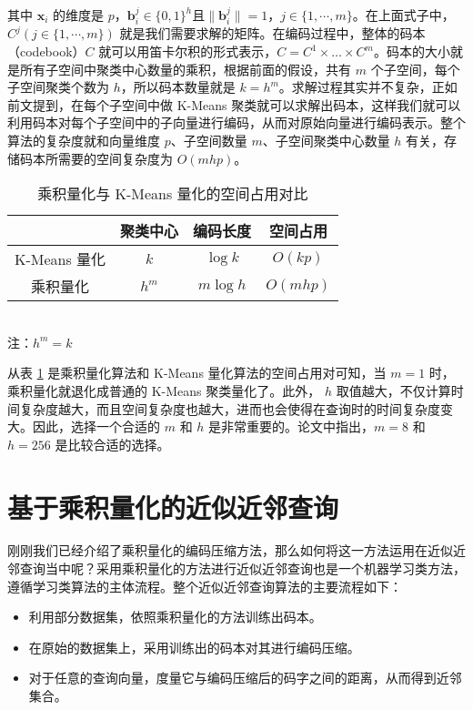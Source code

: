 其中 $\mathbf{x}_i$ 的维度是 $p$，$\mathbf{b}^j_i \in \{0,1\}^h$且$\lVert\mathbf{b}^j_i\rVert=1$，$j \in \{1,\cdots,m\}$。在上面式子中，$C^j(j\in \{1,\cdots,m\})$ 就是我们需要求解的矩阵。在编码过程中，整体的码本（codebook）$C$ 就可以用笛卡尔积的形式表示，$C = C^1 \times \ldots \times C^m$。码本的大小就是所有子空间中聚类中心数量的乘积，根据前面的假设，共有 $m$ 个子空间，每个子空间聚类个数为 $h$，所以码本数量就是 $k = h^m$。求解过程其实并不复杂，正如前文提到，在每个子空间中做 K-Means 聚类就可以求解出码本，这样我们就可以利用码本对每个子空间中的子向量进行编码，从而对原始向量进行编码表示。整个算法的复杂度就和向量维度 $p$、子空间数量 $m$、子空间聚类中心数量 $h$ 有关，存储码本所需要的空间复杂度为 $O(mhp)$。
\begin{table}[htbp]
  \centering
  \caption{乘积量化与 K-Means 量化的空间占用对比}
  \label{tab:kmean_pq}
  \begin{minipage}[t]{0.61\textwidth}
    \begin{tabular}{|c|c|c|c|}
      \hline
                    & 聚类中心 & 编码长度& 空间占用\\
      \hline
      K-Means 量化  &  $k$ &   $\log k$&   $O(kp)$\\
      乘积量化      &   $h^m$ &   $m\log h$ &  $O(mhp)$\\
      \hline
    \end{tabular}\\[2pt]
    \footnotesize 注：$h^m = k$
  \end{minipage}
\end{table}

从表 \ref{tab:kmean_pq} 是乘积量化算法和 K-Means 量化算法的空间占用对可知，当 $m = 1$ 时，乘积量化就退化成普通的 K-Means 聚类量化了。此外， $h$ 取值越大，不仅计算时间复杂度越大，而且空间复杂度也越大，进而也会使得在查询时的时间复杂度变大。因此，选择一个合适的 $m$ 和 $h$ 是非常重要的。论文\cite{Herve_PQ}中指出，$ m = 8 $ 和 $h = 256$ 是比较合适的选择。
\section{基于乘积量化的近似近邻查询}
刚刚我们已经介绍了乘积量化的编码压缩方法，那么如何将这一方法运用在近似近邻查询当中呢？采用乘积量化的方法进行近似近邻查询也是一个机器学习类方法，遵循学习类算法的主体流程。整个近似近邻查询算法的主要流程如下：
\begin{itemize}
\item 利用部分数据集，依照乘积量化的方法训练出码本。
\item 在原始的数据集上，采用训练出的码本对其进行编码压缩。
\item 对于任意的查询向量，度量它与编码压缩后的码字之间的距离，从而得到近邻集合。
\end{itemize}
